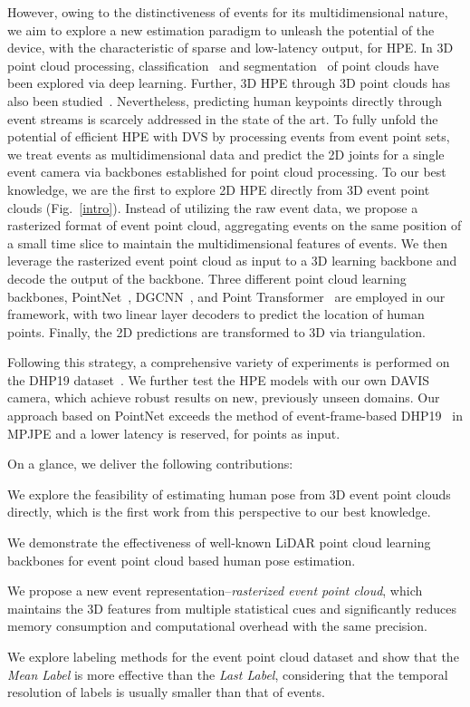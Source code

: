 \documentclass[10pt,twocolumn,letterpaper]{article}
\begin{document}
However, owing to the distinctiveness of events for its multidimensional nature, we aim to explore a new estimation paradigm to unleash the potential of the device, with the characteristic of sparse and low-latency output, for HPE.
In 3D point cloud processing, classification~\cite{qi2017pointnet, qi2017pointnet++} and segmentation~\cite{wang2019dgcnn, zhao2021pointtrans} of point clouds have been explored via deep learning.
Further, 3D HPE through 3D point clouds has also been studied~\cite{zhou2020learning3Dpoint, chan20143pointcloudsystem}.
Nevertheless, predicting human keypoints directly through event streams is scarcely addressed in the state of the art.
To fully unfold the potential of efficient HPE with DVS by processing events from event point sets, we treat events as multidimensional data and predict the 2D joints for a single event camera via backbones established for point cloud processing.
To our best knowledge, we are the first to explore 2D HPE directly from 3D event point clouds (Fig.~\ref{intro}).
Instead of utilizing the raw event data, we propose a rasterized format of event point cloud, aggregating events on the same position of a small time slice to maintain the multidimensional features of events.
We then leverage the rasterized event point cloud as input to a 3D learning backbone and decode the output of the backbone.
Three different point cloud learning backbones, PointNet~\cite{qi2017pointnet}, DGCNN~\cite{wang2019dgcnn}, and Point Transformer~\cite{zhao2021pointtrans} are employed in our framework, with two linear layer decoders to predict the location of human points. Finally, the 2D predictions are transformed to 3D via triangulation.

Following this strategy, a comprehensive variety of experiments is performed on the DHP19 dataset~\cite{calabrese2019dhp19}. We further test the HPE models with our own DAVIS camera, which achieve robust results on new, previously unseen domains. 
Our approach based on PointNet exceeds the method of event-frame-based DHP19~\cite{calabrese2019dhp19} in MPJPE and a lower latency is reserved,  for  points as input.

On a glance, we deliver the following contributions:
\begin{compactitem}
  \item We explore the feasibility of estimating human pose from 3D event point clouds directly, which is the first work from this perspective to our best knowledge.
  \item We demonstrate the effectiveness of well-known LiDAR point cloud learning backbones for event point cloud based human pose estimation.
  \item We propose a new event representation--\emph{rasterized event point cloud}, which maintains the 3D features from multiple statistical cues and significantly reduces memory consumption and computational overhead with the same precision.
  \item We explore labeling methods for the event point cloud dataset and show that the \emph{Mean Label} is more effective than the \emph{Last Label}, considering that the temporal resolution of labels is usually smaller than that of events.
\end{compactitem}
\end{document}
